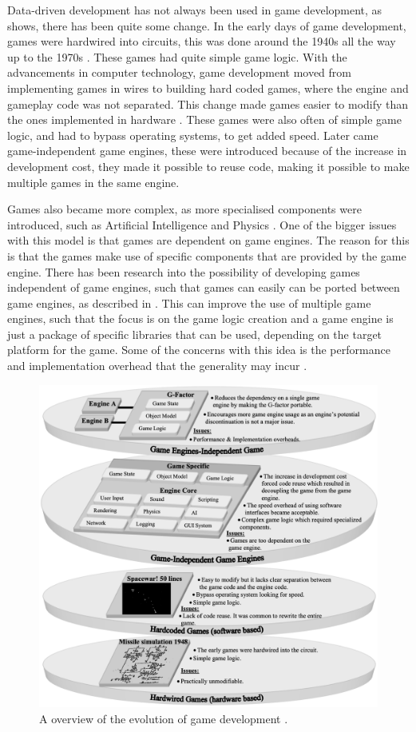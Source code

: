 Data-driven development has not always been used in game development, as  shows, there has been quite some change. In the early days of game development, games were hardwired into circuits, this was done around the 1940s all the way up to the 1970s \cite{cathod-hardwire}. These games had quite simple game logic. With the advancements in computer technology, game development moved from implementing games in wires to building hard coded games, where the engine and gameplay code was not separated. This change made games easier to modify than the ones implemented in hardware \cite{graetz1981origin}. These games were also often of simple game logic, and had to bypass operating systems, to get added speed. Later came game-independent game engines, these were introduced because of the increase in development cost, they made it possible to reuse code, making it possible to make multiple games in the same engine.

Games also became more complex, as more specialised components were introduced, such as Artificial Intelligence and Physics \cite{sherrod2006ultimate}.  One of the bigger issues with this model is that games are dependent on game engines. The reason for this is that the games make use of specific components that are provided by the game engine. There has been research into the possibility of developing games independent of game engines, such that games can easily can be ported between game engines, as described in \cite{BinSubaih2007ASO}. This can improve the use of multiple game engines, such that the focus is on the game logic creation and a game engine is just a package of specific libraries that can be used, depending on the target platform for the game. Some of the concerns with this idea is the performance and implementation overhead that the generality may incur \cite{BinSubaih2007ASO}. 

\begin{figure}[H]
    \centering
    \includegraphics[width=.8\textwidth]{images/Game-development/Game-dev-history.png} 
    \caption{A overview of the evolution of game development \cite{BinSubaih2007ASO}.}
    \label{fig:game-dev-history}
\end{figure}







